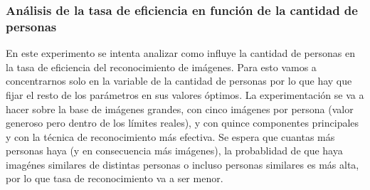 \subsubsection{Análisis de la tasa de eficiencia en función de la cantidad de personas}
En este experimento se intenta analizar como influye la cantidad de personas en la tasa de eficiencia del reconocimiento de imágenes. 
Para esto vamos a concentrarnos solo en la variable de la cantidad de personas por lo que hay que fijar el resto de los parámetros en 
sus valores óptimos. La experimentación se va a hacer sobre la base de imágenes grandes, con cinco imágenes por persona (valor generoso 
pero dentro de los límites reales), y con quince componentes principales y con la técnica de reconocimiento más efectiva.
Se espera que cuantas más personas haya (y en consecuencia más imágenes), la probablidad de que haya imagénes similares de distintas 
personas o incluso personas similares es más alta, por lo que tasa de reconocimiento va a ser menor.
